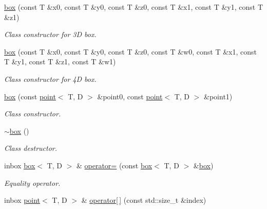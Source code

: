 \begin{DoxyCompactItemize}
\mbox{\label{classacme_1_1box_a2705c2f7df9735d6e6e32237554b4466}} 
\hyperlink{classacme_1_1box_a2705c2f7df9735d6e6e32237554b4466}{box} (const T \&x0, const T \&y0, const T \&z0, const T \&x1, const T \&y1, const T \&z1)
\begin{DoxyCompactList}\small\item\em Class constructor for 3D box. \end{DoxyCompactList}\item 
\mbox{\label{classacme_1_1box_a43b897531d29df21d008df97424a8b55}} 
\hyperlink{classacme_1_1box_a43b897531d29df21d008df97424a8b55}{box} (const T \&x0, const T \&y0, const T \&z0, const T \&w0, const T \&x1, const T \&y1, const T \&z1, const T \&w1)
\begin{DoxyCompactList}\small\item\em Class constructor for 4D box. \end{DoxyCompactList}\item 
\hyperlink{classacme_1_1box_a39e2f47274cc00029918d8d9cd0b641f}{box} (const \hyperlink{classacme_1_1point}{point}$<$ T, D $>$ \&point0, const \hyperlink{classacme_1_1point}{point}$<$ T, D $>$ \&point1)
\begin{DoxyCompactList}\small\item\em Class constructor. \end{DoxyCompactList}\item 
\mbox{\label{classacme_1_1box_a25e3b33ea59fcd1ec24d50f4b80b85c5}} 
\hyperlink{classacme_1_1box_a25e3b33ea59fcd1ec24d50f4b80b85c5}{$\sim$box} ()
\begin{DoxyCompactList}\small\item\em Class destructor. \end{DoxyCompactList}\item 
inbox \hyperlink{classacme_1_1box}{box}$<$ T, D $>$ \& \hyperlink{classacme_1_1box_ae92bb848da92cb2919416eb319e631b9}{operator=} (const \hyperlink{classacme_1_1box}{box}$<$ T, D $>$ \&\hyperlink{classacme_1_1box}{box})
\begin{DoxyCompactList}\small\item\em Equality operator. \end{DoxyCompactList}\item 
inbox \hyperlink{classacme_1_1point}{point}$<$ T, D $>$ \& \hyperlink{classacme_1_1box_a8f22d14fe8194fb76d541cc1222bceb8}{operator\mbox{[}$\,$\mbox{]}} (const std\+::size\+\_\+t \&index)

\end{DoxyCompactItemize}
